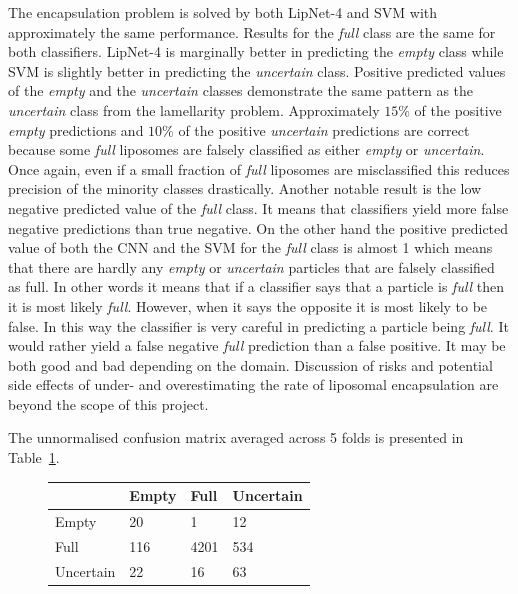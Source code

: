 \documentclass[a4paper, 11pt, table]{article}
\begin{document}
The encapsulation problem is solved by both LipNet-4 and SVM with approximately the same performance. Results for the \textit{full} class are the same for both classifiers. LipNet-4 is marginally better in predicting the \textit{empty} class while SVM is slightly better in predicting the \textit{uncertain} class. Positive predicted values of the \textit{empty} and the \textit{uncertain} classes demonstrate the same pattern as the \textit{uncertain} class from the lamellarity problem. Approximately $15\%$ of the positive \textit{empty} predictions and $10\%$ of the positive \textit{uncertain} predictions are correct because some \textit{full} liposomes are falsely classified as either \textit{empty} or \textit{uncertain}. Once again, even if a small fraction of \textit{full} liposomes are misclassified this reduces precision of the minority classes drastically. Another notable result is the low negative predicted value of the \textit{full} class. It means that classifiers yield more false negative predictions than true negative. On the other hand the positive predicted value of both the CNN and the SVM for the \textit{full} class is almost 1 which means that there are hardly any \textit{empty} or \textit{uncertain} particles that are falsely classified as full. In other words it means that if a classifier says that a particle is \textit{full} then it is most likely \textit{full}. However, when it says the opposite it is most likely to be false. In this way the classifier is very careful in predicting a particle being \textit{full}. It would rather yield a false negative \textit{full} prediction than a false positive. It may be both good and bad depending on the domain. Discussion of risks and potential side effects of under- and overestimating the rate of liposomal encapsulation are beyond the scope of this project. 

The unnormalised confusion matrix averaged across 5 folds  is presented in Table~\ref{table:cnn_encapsulation_cf_not_normalized}.     

\begin{figure}[H]
\centering
{}
\label{table:cnn_encapsulation_cf_not_normalized}
\begin{tabular}{|L{2.5cm} |C{2.5cm} |C{2.5cm} |C{2.5cm}|}
\toprule
 & Empty & Full & Uncertain \\
\midrule
Empty & 20 & 1 & 12 \\
Full & 116 & 4201 & 534 \\
Uncertain & 22 & 16 & 63 \\
\bottomrule
\end{tabular}
\end{figure}
\end{document}
